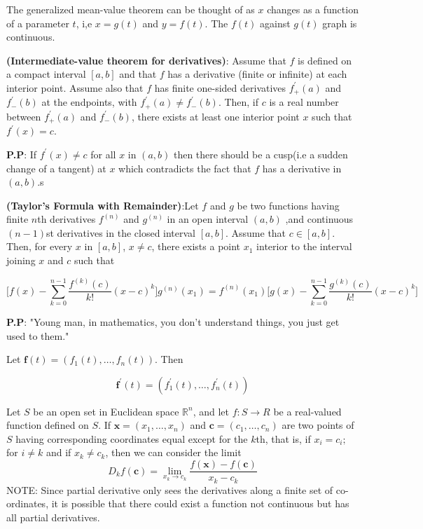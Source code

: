 \documentclass[10pt,a4paper]{book}
\begin{document}
The generalized mean-value theorem can be thought of as $x$ changes as a function of a parameter $t$, i,e $x = g(t)$ and $y = f(t)$. The $f(t)$ against $g(t)$ graph is continuous.

\begin{Thm}
\textbf{(Intermediate-value theorem for derivatives)}: Assume that $f$ is defined on a compact interval $[a, b]$ and that $f$ has a derivative (finite or infinite) at each interior point. Assume also that $f$ has finite one-sided derivatives $f^\prime_+ (a)$ and $f^\prime_-(b)$ at the endpoints, with $f^\prime_+(a) \neq f^\prime_-(b)$. Then, if $c$ is a real number between $f^\prime_+ (a)$ and $f^\prime_-(b)$, there exists at least one interior point $x$ such that $f^\prime(x) = c$.

\end{Thm}
\noindent\textbf{P.P}: If $f^\prime(x) \neq c$ for all $x$ in $(a,b)$ then there should be a cusp(i.e a sudden change of a tangent) at $x$ which contradicts the fact that $f$ has a derivative in $(a,b)$.s

\begin{Thm}
 \textbf{(Taylor's Formula  with Remainder)}:Let $f$ and $g$ be two functions having finite $n$th derivatives $f^{(n)}$ and $g^{(n)}$ in an open interval $(a, b)$ ,and continuous $(n - 1)$st derivatives in the closed interval $[a, b]$. Assume that $c \in [a, b]$. Then, for every $x$ in $[a, b]$, $x \neq c$, there exists a point $x_1$ interior to the interval joining $x$ and $c$ such that 
 
 $$\Bigg[f(x) - \sum_{k=0}^{n-1} \dfrac{f^{(k)}(c)}{k!}(x-c)^k \Bigg]g^{(n)}(x_1) = f^{(n)}(x_1)\Bigg[g(x) - \sum_{k=0}^{n-1} \dfrac{g^{(k)}(c)}{k!}(x-c)^k \Bigg]$$
 
 
 
 
\end{Thm}


\noindent \textbf{P.P}: "Young man, in mathematics, you don't understand things, you just get used to them."

\begin{deff}Let $\mathbf{f}(t) = (f_1(t),  \dots, f_n(t))$. Then

$$\mathbf{f}^\prime(t) = (f_1^\prime(t), \dots, f_n^\prime(t) )$$
\end{deff}

Let $S$ be an open set in Euclidean space $\mathbb{R}^n$, and let $f : S \rightarrow R$ be a real-valued function defined on $S$. If $\mathbf{x} = (x_1, \dots , x_n)$ and $\mathbf{c} = (c_1, \dots , c_n)$ are two points of $S$ having corresponding coordinates equal except for the $k$th, that is, if $x_i = c_i;$ for $i \neq k$ and if $x_k \neq c_k$, then we can consider the limit
$$D_kf(\mathbf{c}) =  \lim_{x_k \rightarrow c_k} \dfrac{f(\mathbf{x}) - f(\mathbf{c})}{x_k - c_k}$$
NOTE: Since partial derivative only sees the derivatives along a finite set of co-ordinates, it is possible that there could exist a function not continuous but has all partial derivatives.
\end{document}
